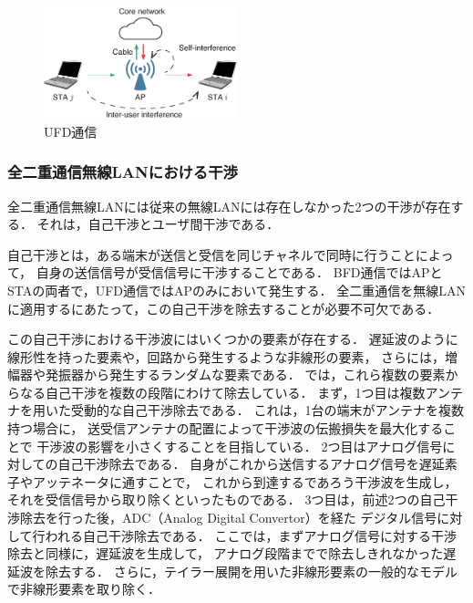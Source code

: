 \documentclass[master]{kuisthesis}		%
\begin{document}
			\begin{figure}[t]
				\begin{center}
					\includegraphics[width=0.5\textwidth]{fig/ufd.eps}
					\caption{UFD通信}
					\label{fig:model_relay}
				\end{center}
			\end{figure}
		\subsubsection{全二重通信無線LANにおける干渉}\label{sec:interference}
			全二重通信無線LANには従来の無線LANには存在しなかった2つの干渉が存在する．
			それは，自己干渉とユーザ間干渉である．
			\par
			自己干渉とは，ある端末が送信と受信を同じチャネルで同時に行うことによって，
			自身の送信信号が受信信号に干渉することである．
			BFD通信ではAPとSTAの両者で，UFD通信ではAPのみにおいて発生する．
			全二重通信を無線LANに適用するにあたって，この自己干渉を除去することが必要不可欠である．

			\par
			この自己干渉における干渉波にはいくつかの要素が存在する．
			遅延波のように線形性を持った要素や，回路から発生するような非線形の要素，
			さらには，増幅器や発振器から発生するランダムな要素である．
			\cite{stanford1,fdmac}では，これら複数の要素からなる自己干渉を複数の段階にわけて除去している．
			まず，1つ目は複数アンテナを用いた受動的な自己干渉除去である．
			これは，1台の端末がアンテナを複数持つ場合に，
			送受信アンテナの配置によって干渉波の伝搬損失を最大化することで
			干渉波の影響を小さくすることを目指している．
			2つ目はアナログ信号に対しての自己干渉除去である．
			自身がこれから送信するアナログ信号を遅延素子やアッテネータに通すことで，
			これから到達するであろう干渉波を生成し，それを受信信号から取り除くといったものである．
			3つ目は，前述2つの自己干渉除去を行った後，ADC（Analog Digital Convertor）を経た
			デジタル信号に対して行われる自己干渉除去である．
			ここでは，まずアナログ信号に対する干渉除去と同様に，遅延波を生成して，
			アナログ段階までで除去しきれなかった遅延波を除去する．
			さらに，テイラー展開を用いた非線形要素の一般的なモデルで非線形要素を取り除く．
\end{document}
